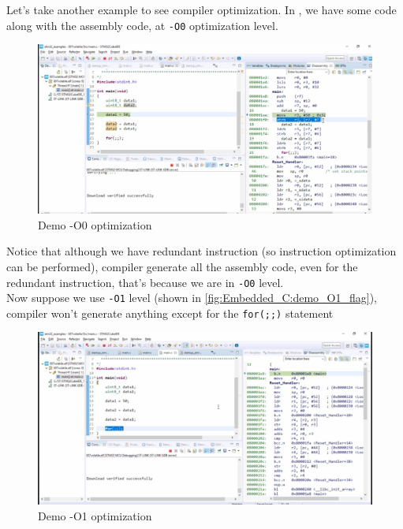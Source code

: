 Let's take another example to see compiler optimization. In , we have some code along with the assembly code, at \verb|-O0| optimization level.

\begin{figure}[h]
\centering
\includegraphics[scale=0.7]{Figures/Embedded_C/demo_O0_flag}
\caption{Demo -O0 optimization}
\label{fig:Embedded_C:demo_O0_flag}
\end{figure} 

Notice that although we have redundant instruction (so instruction optimization can be performed), compiler generate all the assembly code, even for the redundant instruction, that's because we are in \verb|-O0| level.\\


\newpage
Now suppose we use \verb|-O1| level (shown in \autoref{fig:Embedded_C:demo_O1_flag}), compiler won't generate anything except for the \verb|for(;;)| statement 

\begin{figure}[h]
\centering
\includegraphics[scale=0.7]{Figures/Embedded_C/demo_O1_flag}
\caption{Demo -O1 optimization}
\label{fig:Embedded_C:demo_O1_flag}
\end{figure} 

